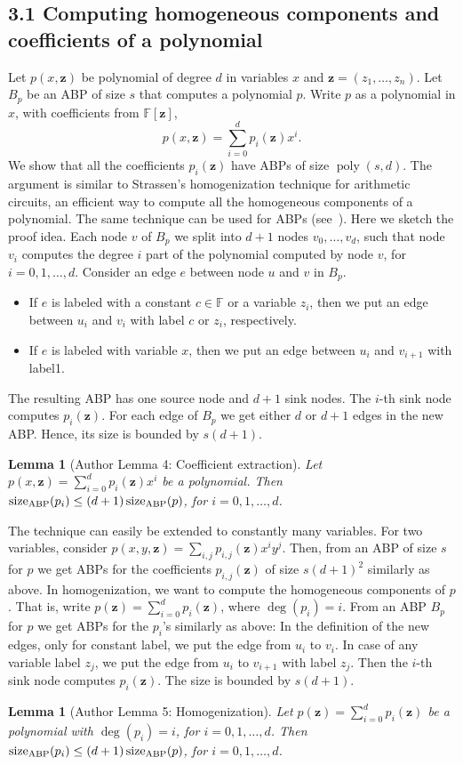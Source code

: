 \documentclass[10pt,a4paper]{article}
\newtheorem{ntlemma}[nttheorem]{Lemma}
\newcommand{\sz}{\operatorname{size}_{\rm ABP}}
\begin{document}
\subsection*{3.1 Computing homogeneous components and coefficients of a polynomial}
Let $p(x,\mathbf z)$ be polynomial of degree $d$ in variables $x$ and $\mathbf z=(z_1,\ldots,z_n)$. Let $B_p$ be an ABP of size $s$ that computes a polynomial $p$. Write $p$ as a polynomial in $x$, with coefficients from $\mathbb F[\mathbf z]$,
\[p(x,\mathbf z)=\sum_{i=0}^dp_i(\mathbf z)x^i.\]
We show that all the coefficients $p_i(\mathbf z)$ have ABPs of size $\operatorname{poly}(s,d)$.
The argument is similar to Strassen's homogenization technique for arithmetic circuits, an efficient way to compute all the homogeneous components of a polynomial. The same technique can be used for ABPs (see~\cite[Lemma 5.2 and Remark]{ref17}). Here we sketch the proof idea.
Each node $v$ of $B_p$ we split into $d+1$ nodes $v_0,\ldots,v_d$, such that node $v_i$ computes the degree $i$ part of the polynomial computed by node $v$, for $i=0,1,\ldots,d$. Consider an edge $e$ between node $u$ and $v$ in $B_p$.
\begin{itemize}\item If $e$ is labeled with a constant $c\in\mathbb F$ or a variable $z_i$, then we put an edge between $u_i$ and $v_i$ with label $c$ or $z_i$, respectively.\item If $e$ is labeled with variable $x$, then we put an edge between $u_i$ and $v_{i+1}$ with label1.\end{itemize}
The resulting ABP has one source node and $d+1$ sink nodes. The $i$-th sink node computes $p_i(\mathbf z)$.
For each edge of $B_p$ we get either $d$ or $d+1$ edges in the new ABP. Hence, its size is bounded by $s(d+1)$.
\setcounter{nttheorem}{3}
\begin{ntlemma}[Author Lemma 4: Coefficient extraction]
Let $p(x,\mathbf z)=\sum_{i=0}^dp_i(\mathbf z)x^i$ be a polynomial. Then $\sz(p_i)\leq(d+1)\sz(p)$, for $i=0,1,\ldots,d$.
\end{ntlemma}
The technique can easily be extended to constantly many variables. For two variables, consider $p(x,y,\mathbf z)=\sum_{i,j}p_{i,j}(\mathbf z)x^iy^j$. Then, from an ABP of size $s$ for $p$ we get ABPs for the coefficients $p_{i,j}(\mathbf z)$ of size $s(d+1)^2$ similarly as above.
In homogenization, we want to compute the homogeneous components of $p$. That is, write $p(\mathbf z)=\sum_{i=0}^dp_i(\mathbf z)$, where $\deg(p_i)=i$. From an ABP $B_p$ for $p$ we get ABPs for the $p_i$'s similarly as above: In the definition of the new edges, only for constant label, we put the edge from $u_i$ to $v_i$. In case of any variable label $z_j$, we put the edge from $u_i$ to $v_{i+1}$ with label $z_j$. Then the $i$-th sink node computes $p_i(\mathbf z)$. The size is bounded by $s(d+1)$.
\begin{ntlemma}[Author Lemma 5: Homogenization]
Let $p(\mathbf z)=\sum_{i=0}^dp_i(\mathbf z)$ be a polynomial with $\deg(p_i)=i$, for $i=0,1,\ldots,d$. Then $\sz(p_i)\leq(d+1)\sz(p)$, for $i=0,1,\ldots,d$.
\end{ntlemma}
\end{document}
